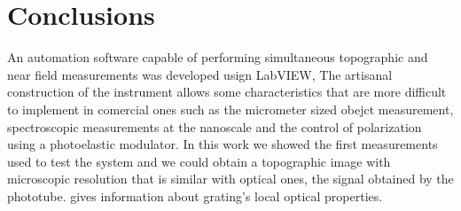 \documentclass[reprint,aps,prb,citeautoscript,altaffilletter]{revtex4-2}
\begin{document}
	\section{Conclusions} \label{conc}
	An automation software capable of performing simultaneous topographic and near field measurements was developed usign LabVIEW, The artisanal construction of the instrument allows 
	some characteristics that are more difficult to implement in comercial ones such as the micrometer sized obejct measurement, spectroscopic measurements at the nanoscale and the control of polarization using 
	a photoelastic modulator. In this work we showed the first measurements used to test the system  and we could obtain a topographic image with microscopic resolution that is similar with optical ones, the signal obtained by the phototube.
	gives information about grating's local optical properties. 

	
	
	
\end{document}
